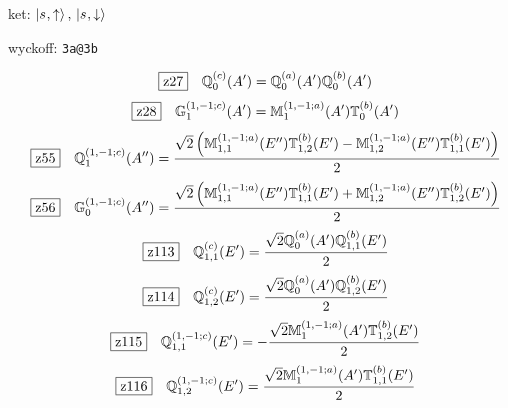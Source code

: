 \documentclass[fleqn,10pt,landscape]{jsarticle}
\begin{document}
\noindent\quad * ket: $\ket{s_{},\uparrow},\, \ket{s_{},\downarrow}$

\noindent\quad * wyckoff: \texttt{3a@3b}

\begin{dmath*}
\hspace*{3mm}\fbox{z27}\quad \mathbb{Q}_{0}^{(c)}(A^{\prime})=\mathbb{Q}_{0}^{(a)}(A^{\prime}) \mathbb{Q}_{0}^{(b)}(A^{\prime})
\end{dmath*}
\begin{dmath*}
\hspace*{3mm}\fbox{z28}\quad \mathbb{G}_{1}^{(1,-1;c)}(A^{\prime})=\mathbb{M}_{1}^{(1,-1;a)}(A^{\prime}) \mathbb{T}_{0}^{(b)}(A^{\prime})
\end{dmath*}
\begin{dmath*}
\hspace*{3mm}\fbox{z55}\quad \mathbb{Q}_{1}^{(1,-1;c)}(A^{\prime\prime})=\frac{\sqrt{2} \left(\mathbb{M}_{1,1}^{(1,-1;a)}(E^{\prime\prime}) \mathbb{T}_{1,2}^{(b)}(E^{\prime}) - \mathbb{M}_{1,2}^{(1,-1;a)}(E^{\prime\prime}) \mathbb{T}_{1,1}^{(b)}(E^{\prime})\right)}{2}
\end{dmath*}
\begin{dmath*}
\hspace*{3mm}\fbox{z56}\quad \mathbb{G}_{0}^{(1,-1;c)}(A^{\prime\prime})=\frac{\sqrt{2} \left(\mathbb{M}_{1,1}^{(1,-1;a)}(E^{\prime\prime}) \mathbb{T}_{1,1}^{(b)}(E^{\prime}) + \mathbb{M}_{1,2}^{(1,-1;a)}(E^{\prime\prime}) \mathbb{T}_{1,2}^{(b)}(E^{\prime})\right)}{2}
\end{dmath*}
\begin{dmath*}
\hspace*{3mm}\fbox{z113}\quad \mathbb{Q}_{1,1}^{(c)}(E^{\prime})=\frac{\sqrt{2} \mathbb{Q}_{0}^{(a)}(A^{\prime}) \mathbb{Q}_{1,1}^{(b)}(E^{\prime})}{2}
\end{dmath*}
\begin{dmath*}
\hspace*{3mm}\fbox{z114}\quad \mathbb{Q}_{1,2}^{(c)}(E^{\prime})=\frac{\sqrt{2} \mathbb{Q}_{0}^{(a)}(A^{\prime}) \mathbb{Q}_{1,2}^{(b)}(E^{\prime})}{2}
\end{dmath*}
\begin{dmath*}
\hspace*{3mm}\fbox{z115}\quad \mathbb{Q}_{1,1}^{(1,-1;c)}(E^{\prime})=- \frac{\sqrt{2} \mathbb{M}_{1}^{(1,-1;a)}(A^{\prime}) \mathbb{T}_{1,2}^{(b)}(E^{\prime})}{2}
\end{dmath*}
\begin{dmath*}
\hspace*{3mm}\fbox{z116}\quad \mathbb{Q}_{1,2}^{(1,-1;c)}(E^{\prime})=\frac{\sqrt{2} \mathbb{M}_{1}^{(1,-1;a)}(A^{\prime}) \mathbb{T}_{1,1}^{(b)}(E^{\prime})}{2}
\end{dmath*}
\end{document}
